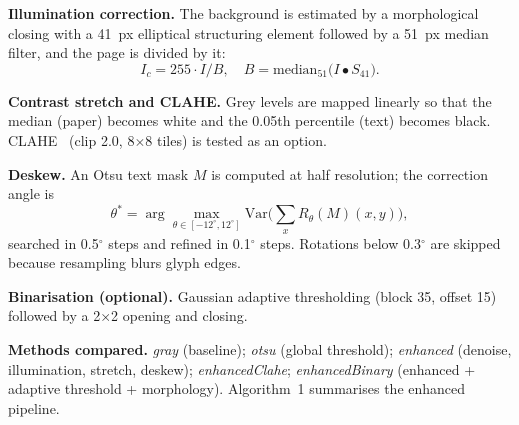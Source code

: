 \documentclass[conference]{IEEEtran}
\begin{document}
\textbf{Illumination correction.} The background is estimated by a morphological closing with a 41~px elliptical structuring element followed by a 51~px median filter, and the page is divided by it:
\begin{equation}
I_c = 255 \cdot I / B, \quad B = \mathrm{median}_{51}\big(I \bullet S_{41}\big).
\end{equation}

\textbf{Contrast stretch and CLAHE.} Grey levels are mapped linearly so that the median (paper) becomes white and the 0.05th percentile (text) becomes black. CLAHE~\cite{zuiderveld1994} (clip 2.0, 8$\times$8 tiles) is tested as an option.

\textbf{Deskew.} An Otsu text mask $M$ is computed at half resolution; the correction angle is
\begin{equation}
\theta^{*} = \arg\max_{\theta \in [-12^\circ, 12^\circ]} \mathrm{Var}\Big(\sum_{x} R_{\theta}(M)(x, y)\Big),
\end{equation}
searched in 0.5$^\circ$ steps and refined in 0.1$^\circ$ steps. Rotations below 0.3$^\circ$ are skipped because resampling blurs glyph edges.

\textbf{Binarisation (optional).} Gaussian adaptive thresholding (block 35, offset 15) followed by a 2$\times$2 opening and closing.

\textbf{Methods compared.} \emph{gray} (baseline); \emph{otsu} (global threshold); \emph{enhanced} (denoise, illumination, stretch, deskew); \emph{enhancedClahe}; \emph{enhancedBinary} (enhanced + adaptive threshold + morphology). Algorithm~1 summarises the enhanced pipeline.
\end{document}

